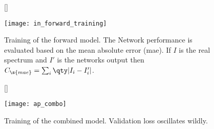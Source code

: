 \begin{figure}[H]
    [\FBwidth]
    {\caption{
        Training of the forward model. The Network performance is evaluated based on the mean absolute error (mae). If $I$ is the real spectrum and $I'$ is the networks output then 
        $C_\s{mae} = \sum_i \qty|I_i - I'_i|$.
    }
    \label{fig:in:forward_training}}
    {\texttt{[image: in\_forward\_training]}}
\end{figure}

\begin{figure}[H]
    [\FBwidth]
    {\caption{
        Training of the combined model. Validation loss oscillates wildly.
    }
    \label{fig:ap:combined_training}}
    {\texttt{[image: ap\_combo]}}
\end{figure}
